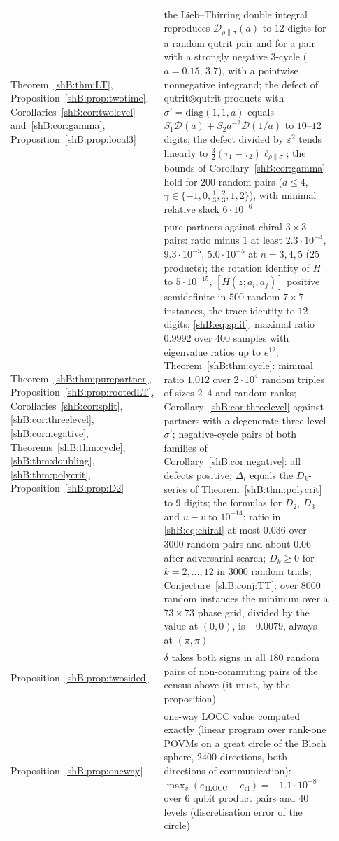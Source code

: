 {\begin{longtable}{>{\raggedright\arraybackslash}p{0.38\linewidth}>{\raggedright\arraybackslash}p{0.55\linewidth}}
Theorem~\ref{shB:thm:LT}, Proposition~\ref{shB:prop:twotime}, Corollaries~\ref{shB:cor:twolevel} and~\ref{shB:cor:gamma}, Proposition~\ref{shB:prop:local3} & the Lieb--Thirring double integral reproduces $\mathcal D_{\rho\|\sigma}(a)$ to $12$ digits for a random qutrit pair and for a pair with a strongly negative $3$-cycle ($a=0.15,\,3.7$), with a pointwise nonnegative integrand; the defect of qutrit$\otimes$qutrit products with $\sigma'=\mathrm{diag}(1,1,a)$ equals $S_1\mathcal D(a)+S_2a^{-2}\mathcal D(1/a)$ to $10$--$12$ digits; the defect divided by $\varepsilon^2$ tends linearly to $\frac32(\tau_1-\tau_2)\ell_{\rho\|\sigma}$; the bounds of Corollary~\ref{shB:cor:gamma} hold for $200$ random pairs ($d\le4$, $\gamma\in\{-1,0,\frac13,\frac23,1,2\}$), with minimal relative slack $6\cdot10^{-6}$\\
Theorem~\ref{shB:thm:purepartner}, Proposition~\ref{shB:prop:rootedLT}, Corollaries~\ref{shB:cor:split}, \ref{shB:cor:threelevel}, \ref{shB:cor:negative}, Theorems~\ref{shB:thm:cycle}, \ref{shB:thm:doubling}, \ref{shB:thm:polycrit}, Proposition~\ref{shB:prop:D2} & pure partners against chiral $3\times3$ pairs: ratio minus $1$ at least $2.3\cdot10^{-4}$, $9.3\cdot10^{-5}$, $5.0\cdot10^{-5}$ at $n=3,4,5$ ($25$ products); the rotation identity of $H$ to $5\cdot10^{-15}$, $[H(z;a_i,a_j)]$ positive semidefinite in $500$ random $7\times7$ instances, the trace identity to $12$ digits; \eqref{shB:eq:split}: maximal ratio $0.9992$ over $400$ samples with eigenvalue ratios up to $e^{12}$; Theorem~\ref{shB:thm:cycle}: minimal ratio $1.012$ over $2\cdot10^4$ random triples of sizes $2$--$4$ and random ranks; Corollary~\ref{shB:cor:threelevel} against partners with a degenerate three-level $\sigma'$; negative-cycle pairs of both families of Corollary~\ref{shB:cor:negative}: all defects positive; $\Delta_t$ equals the $D_k$-series of Theorem~\ref{shB:thm:polycrit} to $9$ digits; the formulas for $D_2$, $D_3$ and $u-v$ to $10^{-14}$; ratio in \eqref{shB:eq:chiral} at most $0.036$ over $3000$ random pairs and about $0.06$ after adversarial search; $D_k\ge0$ for $k=2,\dots,12$ in $3000$ random trials; Conjecture~\ref{shB:conj:TT}: over $8000$ random instances the minimum over a $73\times73$ phase grid, divided by the value at $(0,0)$, is $+0.0079$, always at $(\pi,\pi)$\\
Proposition~\ref{shB:prop:twosided} & $\delta$ takes both signs in all $180$ random pairs of non-commuting pairs of the census above (it must, by the proposition)\\
Proposition~\ref{shB:prop:oneway} & one-way LOCC value computed exactly (linear program over rank-one POVMs on a great circle of the Bloch sphere, $2400$ directions, both directions of communication): $\max_v(e_{\mathrm{1LOCC}}-e_{\mathrm{cl}})=-1.1\cdot10^{-8}$ over $6$ qubit product pairs and $40$ levels (discretisation error of the circle)\\

\end{longtable}}
